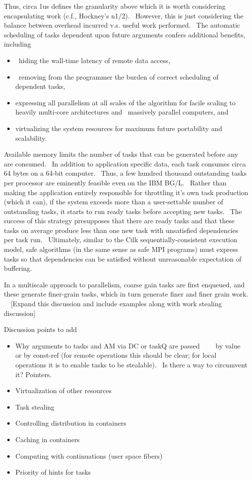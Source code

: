 \documentclass[letterpaper]{article}
\newcommand\liststyleLviii{%
\renewcommand\labelitemi{${\bullet}$}
\renewcommand\labelitemii{${\circ}$}
\renewcommand\labelitemiii{${\blacksquare}$}
\renewcommand\labelitemiv{${\bullet}$}
}
\newcommand\liststyleLix{%
\renewcommand\labelitemi{${\bullet}$}
\renewcommand\labelitemii{${\circ}$}
\renewcommand\labelitemiii{${\blacksquare}$}
\renewcommand\labelitemiv{${\bullet}$}
}
\begin{document}
Thus, circa 1us defines the granularity above which it is worth considering encapsulating work (c.f., Hockney's n1/2).
\ However, this is just considering the balance between overhead incurred v.s. useful work performed. \ The automatic
scheduling of tasks dependent upon future arguments confers additional benefits, including

\liststyleLviii
\begin{itemize}
\item \ hiding the wall-time latency of remote data access,
\item \ removing from the programmer the burden of correct scheduling of dependent tasks, 
\item expressing all parallelism at all scales of the algorithm for facile scaling to heavily multi-core architectures
and \ massively parallel computers, and
\item virtualizing the system resources for maximum future portability and scalability.
\end{itemize}
Available memory limits the number of tasks that can be generated before any are consumed. \ In addition to application
specific data, each task consumes circa 64 bytes on a 64-bit computer. \ Thus, a few hundred thousand outstanding tasks
per processor are eminently feasible even on the IBM BG/L. \ Rather than making the application entirely responsible
for throttling it's own task production (which it can), if the system exceeds more than a user-settable number of
outstanding tasks, it starts to run ready tasks before accepting new tasks. \ The success of this strategy presupposes
that there are ready tasks and that these tasks on average produce less than one new task with unsatisfied dependencies
per task run. \ Ultimately, similar to the Cilk sequentially-consistent execution model, safe algorithms (in the same
sense as safe MPI programs) must express tasks so that dependencies can be satisfied without unreasonable expectation
of buffering.

In a multiscale approach to parallelism, coarse gain tasks are first enqueued, and these generate finer-grain tasks,
which in turn generate finer and finer grain work. \ \ [Expand this discussion and include examples along with work
stealing discussion]

Discussion points to add

\liststyleLix
\begin{itemize}
\item Why arguments to tasks and AM via DC or taskQ are passed \ \ \ \ by value or by const-ref (for remote operations
this should be clear; for local operations it is to enable tasks to be stealable). \ Is there a way to circumvent it?
Pointers.
\item Virtualization of other resources
\item Task stealing
\item Controlling distribution in containers
\item Caching in containers
\item Computing with continuations (user space fibers)
\item Priority of hints for tasks
\end{itemize}
\end{document}
